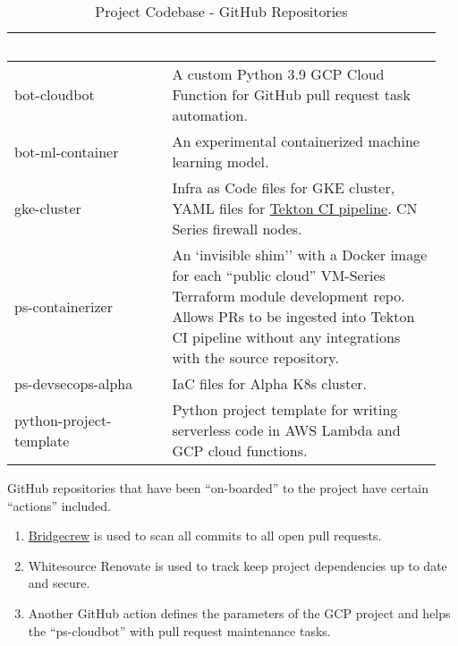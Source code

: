 \begin{table}[ht]
    \centering
	\begin{tabular}{| p{0.35\linewidth} | p{0.6\linewidth} |} \hline
		\cellcolor{myblue}\textcolor{white}{Repo Name} & \cellcolor{myblue}\textcolor{white}{Purpose} \\\hline
		bot-cloudbot     & A custom Python 3.9 GCP Cloud Function for GitHub pull request task automation.\\\hline
		bot-ml-container & An experimental containerized machine learning model.\\\hline
		gke-cluster      & Infra as Code files for GKE cluster, YAML files for \href{https://tekton.dev/}{Tekton CI pipeline}. CN Series firewall nodes.\\\hline
		ps-containerizer & An `invisible shim'' with a Docker image for each ``public cloud'' VM-Series Terraform module development repo. Allows PRs to be
		ingested into Tekton CI pipeline without any integrations with the source repository.\\\hline
		ps-devsecops-alpha & IaC files for Alpha K8s cluster.\\\hline
		python-project-template & Python project template for writing serverless code in AWS Lambda and GCP cloud functions.\\\hline
	\end{tabular}
	\caption{Project Codebase - GitHub Repositories}
    \label{mytable:1}
\end{table}
\vspace{2mm}
\vspace{2mm}

\justifying
GitHub repositories that have been ``on-boarded'' to the project have certain ``actions'' included.

\begin{raggedright}
	\begin{enumerate}
        \item \href{https://docs.bridgecrew.io/docs}{Bridgecrew} is used to scan all commits to all open pull requests.
        \item Whitesource Renovate is used to track keep project dependencies up to date and secure.
        \item Another GitHub action defines the parameters of the GCP project and helps the ``ps-cloudbot'' with pull request  maintenance tasks.
	\end{enumerate}
\end{raggedright}
\vspace{2mm}


